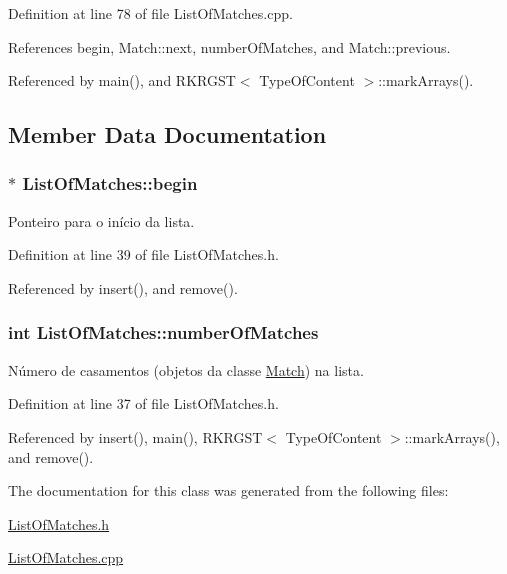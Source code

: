 Definition at line 78 of file List\+Of\+Matches.\+cpp.



References begin, Match\+::next, number\+Of\+Matches, and Match\+::previous.



Referenced by main(), and R\+K\+R\+G\+S\+T$<$ Type\+Of\+Content $>$\+::mark\+Arrays().



\subsection{Member Data Documentation}
\hypertarget{classListOfMatches_adc4925222fa338afdbbcdd7e5c37e2c9}{
\subsubsection[{begin}]{$\ast$ List\+Of\+Matches\+::begin}}\label{classListOfMatches_adc4925222fa338afdbbcdd7e5c37e2c9}


Ponteiro para o início da lista. 



Definition at line 39 of file List\+Of\+Matches.\+h.



Referenced by insert(), and remove().

\hypertarget{classListOfMatches_ab5b4c972df3758bed3fd5ace4d78a4c8}{
\subsubsection[{number\+Of\+Matches}]{\setlength{\rightskip}{0pt plus 5cm}int List\+Of\+Matches\+::number\+Of\+Matches}}\label{classListOfMatches_ab5b4c972df3758bed3fd5ace4d78a4c8}


Número de casamentos (objetos da classe \hyperlink{classMatch}{Match}) na lista. 



Definition at line 37 of file List\+Of\+Matches.\+h.



Referenced by insert(), main(), R\+K\+R\+G\+S\+T$<$ Type\+Of\+Content $>$\+::mark\+Arrays(), and remove().



The documentation for this class was generated from the following files\+:\begin{DoxyCompactItemize}
\item 
\hyperlink{ListOfMatches_8h}{List\+Of\+Matches.\+h}\item 
\hyperlink{ListOfMatches_8cpp}{List\+Of\+Matches.\+cpp}\end{DoxyCompactItemize}
